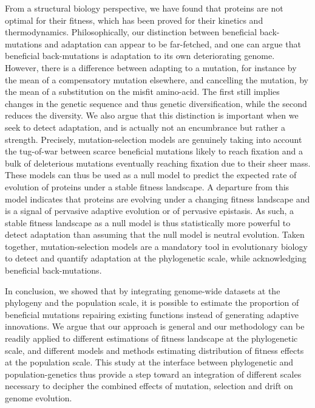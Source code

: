 \documentclass{article}
\begin{document}
    From a structural biology perspective, we have found that proteins are not optimal for their fitness, which has been proved for their kinetics and thermodynamics\cite{hartl_compensatory_1996, taverna_why_2002, goldstein_evolution_2011}.
    Philosophically, our distinction between beneficial back-mutations and adaptation can appear to be far-fetched, and one can argue that beneficial back-mutations is adaptation to its own deteriorating genome.
    However, there is a difference between adapting to a mutation, for instance by the mean of a compensatory mutation elsewhere, and cancelling the mutation, by the mean of a substitution on the misfit amino-acid.
    The first still implies changes in the genetic sequence and thus genetic diversification, while the second reduces the diversity.
    We also argue that this distinction is important when we seek to detect adaptation, and is actually not an encumbrance but rather a strength.
    Precisely, mutation-selection models are genuinely taking into account the tug-of-war between scarce beneficial mutations likely to reach fixation and a bulk of deleterious mutations eventually reaching fixation due to their sheer mass.
    These models can thus be used as a null model to predict the expected rate of evolution of proteins\cite{spielman_relationship_2015, dosreis_how_2015} under a stable fitness landscape.
    A departure from this model indicates that proteins are evolving under a changing fitness landscape\cite{cvijovic_fate_2015, rodrigue_detecting_2017, tamuri_mutationselection_2021} and is a signal of pervasive adaptive evolution\cite{rodrigue_bayesian_2021} or of pervasive epistasis\cite{rodrigue_detecting_2017}.
    As such, a stable fitness landscape as a null model is thus statistically more powerful to detect adaptation than assuming that the null model is neutral evolution.
    Taken together, mutation-selection models are a mandatory tool in evolutionary biology to detect and quantify adaptation at the phylogenetic scale, while acknowledging beneficial back-mutations.

    In conclusion, we showed that by integrating genome-wide datasets at the phylogeny and the population scale, it is possible to estimate the proportion of beneficial mutations repairing existing functions instead of generating adaptive innovations.
    We argue that our approach is general and our methodology can be readily applied to different estimations of fitness landscape at the phylogenetic scale, and different models and methods estimating distribution of fitness effects at the population scale.
    This study at the interface between phylogenetic and population-genetics thus provide a step toward an integration of different scales necessary to decipher the combined effects of mutation, selection and drift on genome evolution.
\end{document}

